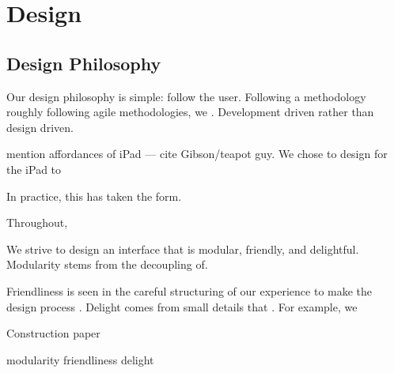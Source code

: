 \chapter{Design}

\section{Design Philosophy}\label{design-philosophy}

Our design philosophy is simple: follow the user. Following a
methodology roughly following agile methodologies, we . Development
driven rather than design driven.

mention affordances of iPad --- cite Gibson/teapot guy. We chose to
design for the iPad to

In practice, this has taken the form.

Throughout,

We strive to design an interface that is modular, friendly, and
delightful. Modularity stems from the decoupling of.

Friendliness is seen in the careful structuring of our experience to
make the design process . Delight comes from small details that . For
example, we

Construction paper

modularity friendliness delight
